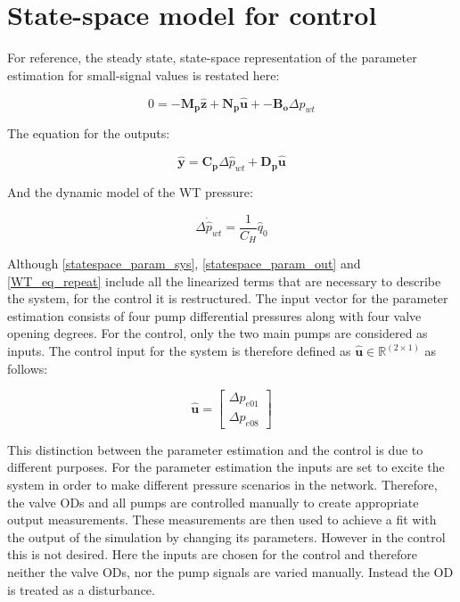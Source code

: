 \section{State-space model for control}
 \label{SystemLin_control}
 
For reference, the steady state, state-space representation of the parameter estimation for small-signal values is restated here:
 
 \begin{equation} 
 0 = -\bm{M_p} \bm{\hat{z}} + \bm{N_p} \bm{\hat{u}} + -\bm{B_o} \Delta \hat{p}_{wt}    
 \label{statespace_param_sys}
\end{equation}

The equation for the outputs:

\begin{equation}
  \bm{\hat{y}} = \bm{C_p} \Delta \hat{p}_{wt} + \bm{D_p} \bm{\hat{u}} 
   \label{statespace_param_out}
\end{equation}

And the dynamic model of the WT pressure:

\begin{equation}
\Delta \dot{\hat{p}}_{wt} = \frac{1}{C_H} \hat{q}_0
 \label{WT_eq_repeat}
\end{equation}

Although \eqref{statespace_param_sys}, \eqref{statespace_param_out} and \eqref{WT_eq_repeat} include all the linearized terms that are necessary to describe the system, for the control it is restructured. The input vector for the parameter estimation consists of four pump differential pressures along with four valve opening degrees. For the control, only the two main pumps are considered as inputs. The control input for the system is therefore defined as $\bm{\hat{u}} \in \bm{\mathbb{R}}^{(2 \times 1)}$ as follows: 

\begin{equation}
\bm{\hat{u}} =
\begin{bmatrix} 
\Delta p_{e01} \\
\Delta p_{e08} 
\label{inputvector_control}
\end{bmatrix} 
\end{equation}

This distinction between the parameter estimation and the control is due to different purposes. For the parameter estimation the inputs are set to excite the system in order to make different pressure scenarios in the network. Therefore, the valve ODs and all pumps are controlled manually to create appropriate output measurements. These measurements are then used to achieve a fit with the output of the simulation by changing its parameters. However in the control this is not desired. Here the inputs are chosen for the control and therefore neither the valve ODs, nor the pump signals are varied manually. Instead the OD is treated as a disturbance. 


